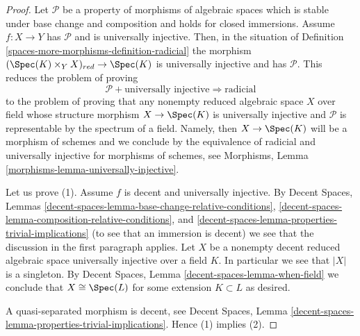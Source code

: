\begin{proof}
Let $\mathcal{P}$ be a property of morphisms of algebraic spaces
which is stable under base change and composition and holds for
closed immersions. Assume $f : X \to Y$ has $\mathcal{P}$ and
is universally injective. Then, in the situation of
Definition \ref{spaces-more-morphisms-definition-radicial}
the morphism $(\Spec(K) \times_Y X)_{red} \to \Spec(K)$
is universally injective and has $\mathcal{P}$. This reduces the
problem of proving
$$
\mathcal{P} + \text{universally injective}
\Rightarrow
\text{radicial}
$$
to the problem of proving that any nonempty reduced algebraic space $X$
over field whose structure morphism $X \to \Spec(K)$ is universally
injective and $\mathcal{P}$ is representable by the spectrum of a field.
Namely, then $X \to \Spec(K)$ will be a morphism of schemes and
we conclude by the equivalence of radicial and universally injective for
morphisms of schemes, see
Morphisms, Lemma \ref{morphisms-lemma-universally-injective}.

\medskip\noindent
Let us prove (1). Assume $f$ is decent and universally injective. By
Decent Spaces,
Lemmas \ref{decent-spaces-lemma-base-change-relative-conditions},
\ref{decent-spaces-lemma-composition-relative-conditions}, and
\ref{decent-spaces-lemma-properties-trivial-implications}
(to see that an immersion is decent) we see that the discussion in
the first paragraph applies.
Let $X$ be a nonempty decent reduced algebraic space
universally injective over a field $K$. In particular we see that $|X|$
is a singleton. By
Decent Spaces, Lemma \ref{decent-spaces-lemma-when-field}
we conclude that $X \cong \Spec(L)$ for some extension
$K \subset L$ as desired.

\medskip\noindent
A quasi-separated morphism is decent, see
Decent Spaces,
Lemma \ref{decent-spaces-lemma-properties-trivial-implications}.
Hence (1) implies (2).


\end{proof}
